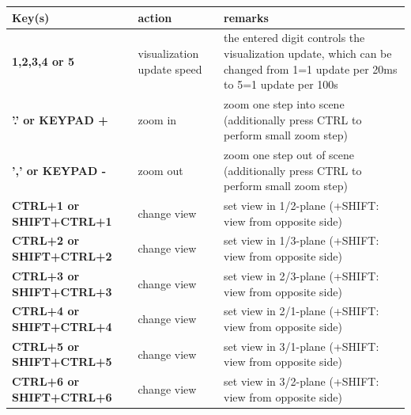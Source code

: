 \documentclass[11pt,a4paper]{book}
\begin{document}
\begin{center}
  \footnotesize
  \begin{longtable}{| p{4cm} | p{4cm} | p{8cm} |} 
	\hline
  \bf Key(s) & action & \bf remarks \\ \hline
  \bf 1,2,3,4 or 5 & visualization update speed & the entered digit controls the visualization update, which can be changed from 1=1 update per 20ms to 5=1 update per 100s\\ \hline
  \bf '.' or KEYPAD + & zoom in & zoom one step into scene (additionally press CTRL to perform small zoom step)\\ \hline
  \bf ',' or KEYPAD - & zoom out & zoom one step out of scene (additionally press CTRL to perform small zoom step)\\ \hline
  \bf CTRL+1 or SHIFT+CTRL+1& change view& set view in 1/2-plane (+SHIFT: view from opposite side) \\ \hline
  \bf CTRL+2 or SHIFT+CTRL+2& change view& set view in 1/3-plane (+SHIFT: view from opposite side) \\ \hline
  \bf CTRL+3 or SHIFT+CTRL+3& change view& set view in 2/3-plane (+SHIFT: view from opposite side) \\ \hline
  \bf CTRL+4 or SHIFT+CTRL+4& change view& set view in 2/1-plane (+SHIFT: view from opposite side) \\ \hline
  \bf CTRL+5 or SHIFT+CTRL+5& change view& set view in 3/1-plane (+SHIFT: view from opposite side) \\ \hline
  \bf CTRL+6 or SHIFT+CTRL+6& change view& set view in 3/2-plane (+SHIFT: view from opposite side) \\ \hline


\end{longtable}
\end{center}
\end{document}
